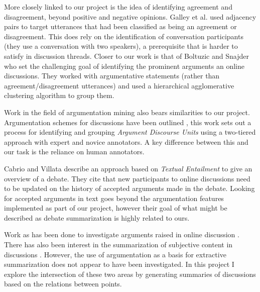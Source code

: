     More closely linked to our project is the idea of identifying agreement and disagreement, beyond positive and negative opinions. Galley et al. \cite{galley2004identifying} used adjacency pairs to target utterances that had been classified as being an agreement or disagreement. This does rely on the identification of conversation participants (they use a conversation with two speakers), a prerequisite that is harder to satisfy in discussion threads. Closer to our work is that of Boltuzic and Snajder \cite{boltuzic2015identifying} who set the challenging goal of identifying the prominent arguments an online discussions. They worked with argumentative statements (rather than agreement/disagreement utterances) and used a hierarchical agglomerative clustering algorithm to group them.

    Work in the field of argumentation mining also bears similarities to our project. Argumentation schemes for discussions have been outlined \cite{ghosh2014analyzing}, this work sets out a process for identifying and grouping \textit{Argument Discourse Units} using a two-tiered approach with expert and novice annotators. A key difference between this and our task is the reliance on human annotators.

    Cabrio and Villata \cite{cabrio2012combining} describe an approach based on \textit{Textual Entailment} to give an overview of a debate. They cite that new participants to online discussions need to be updated on the history of accepted arguments made in the debate. Looking for accepted arguments in text goes beyond the argumentation features implemented as part of our project, however their goal of what might be described as debate summarization is highly related to ours.

    Work as has been done to investigate arguments raised in online discussion \cite{boltuzic2015identifying,cabrio2012combining,ghosh2014analyzing}. There has also been interest in the summarization of subjective content in discussions \cite{hu2004mining,lloret2009towards,galley2004identifying}. However, the use of argumentation as a basis for extractive summarization does not appear to have been investigated. In this project I explore the intersection of these two areas by generating summaries of discussions based on the relations between points.
